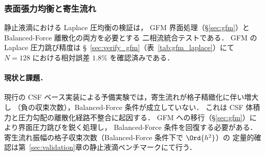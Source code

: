 \subsubsection{表面張力均衡と寄生流れ}
\label{sec:bf_static_droplet}

静止液滴における Laplace 圧均衡の検証は，
GFM 界面処理（§\ref{sec:gfm}）と Balanced-Force 離散化の両方を必要とする
二相流統合テストである．
GFM の Laplace 圧力跳び精度は §~\ref{sec:verify_gfm}（表~\ref{tab:gfm_laplace}）にて
$N=128$ における相対誤差 $1.8\%$ を確認済みである．

\paragraph{現状と課題．}
現行の CSF ベース実装による予備実験では，寄生流れが格子精緻化に伴い増大し
（負の収束次数），Balanced-Force 条件が成立していない．
これは CSF 体積力と圧力勾配の離散化経路不整合に起因する．
GFM への移行（§\ref{sec:gfm}）により界面圧力跳びを鋭く処理し，
Balanced-Force 条件を回復する必要がある．
寄生流れ振幅の格子収束次数（Balanced-Force 条件下で $\Ord{h^2}$）の
定量的確認は第~\ref{sec:validation}章の静止液滴ベンチマークにて行う．
